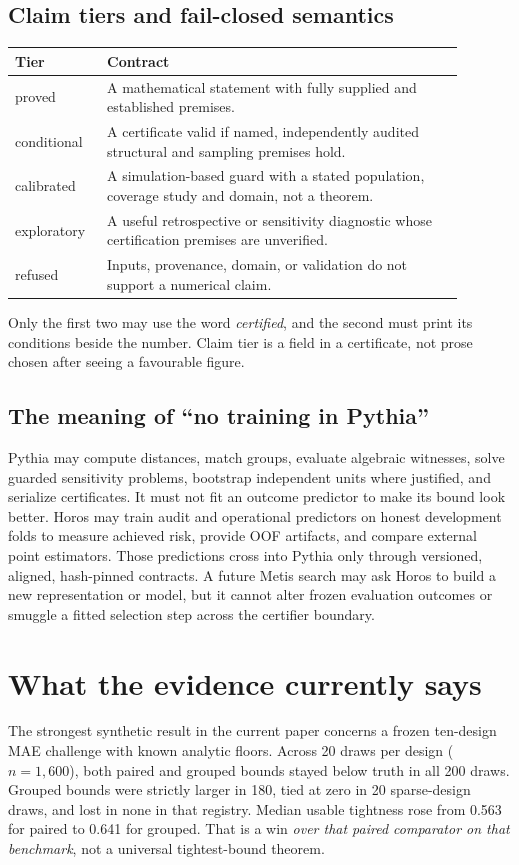 \documentclass[11pt]{article}
\newcommand{\tier}[1]{\textsf{#1}}
\begin{document}
\subsection{Claim tiers and fail-closed semantics}
\begin{center}\begin{tabular}{p{0.17\linewidth}p{0.72\linewidth}}\toprule
Tier & Contract\\\midrule
\tier{proved} & A mathematical statement with fully supplied and established premises.\\
\tier{conditional} & A certificate valid if named, independently audited structural and sampling premises hold.\\
\tier{calibrated} & A simulation-based guard with a stated population, coverage study and domain, not a theorem.\\
\tier{exploratory} & A useful retrospective or sensitivity diagnostic whose certification premises are unverified.\\
\tier{refused} & Inputs, provenance, domain, or validation do not support a numerical claim.\\
\bottomrule\end{tabular}\end{center}
Only the first two may use the word \emph{certified}, and the second must print its conditions beside the number. Claim tier is a field in a certificate, not prose chosen after seeing a favourable figure.

\subsection{The meaning of ``no training in Pythia''}
Pythia may compute distances, match groups, evaluate algebraic witnesses, solve guarded sensitivity problems, bootstrap independent units where justified, and serialize certificates. It must not fit an outcome predictor to make its bound look better. Horos may train audit and operational predictors on honest development folds to measure achieved risk, provide OOF artifacts, and compare external point estimators. Those predictions cross into Pythia only through versioned, aligned, hash-pinned contracts. A future Metis search may ask Horos to build a new representation or model, but it cannot alter frozen evaluation outcomes or smuggle a fitted selection step across the certifier boundary.

\section{What the evidence currently says}
The strongest synthetic result in the current paper concerns a frozen ten-design MAE challenge with known analytic floors. Across 20 draws per design ($n=1{,}600$), both paired and grouped bounds stayed below truth in all 200 draws. Grouped bounds were strictly larger in 180, tied at zero in 20 sparse-design draws, and lost in none in that registry. Median usable tightness rose from 0.563 for paired to 0.641 for grouped. That is a win \emph{over that paired comparator on that benchmark}, not a universal tightest-bound theorem.
\end{document}
